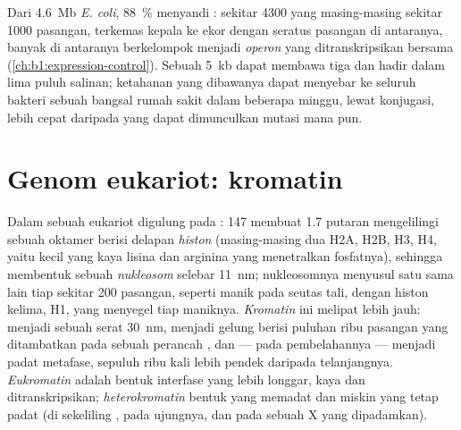 \begin{example}\label{ex:b1:genomes:dense}
Dari \qty{4.6}{Mb}  \emph{E. coli}, \qty{88}{\%} menyandi
: sekitar \num{4300}  yang masing-masing sekitar \num{1000}
pasangan, terkemas kepala ke ekor dengan seratus pasangan di antaranya,
banyak di antaranya berkelompok menjadi \emph{operon} yang
ditranskripsikan bersama (\cref{ch:b1:expression-control}). Sebuah
 \qty{5}{kb} dapat membawa tiga  dan hadir dalam lima puluh
salinan;  ketahanan yang dibawanya dapat menyebar ke seluruh bakteri
sebuah bangsal rumah sakit dalam beberapa minggu, lewat konjugasi, lebih
cepat daripada yang dapat dimunculkan mutasi mana pun.
\end{example}

\section{Genom eukariot: kromatin}

\begin{definition}\label{def:b1:genomes:nucleosome}
Dalam sebuah  eukariot  digulung pada : \qty{147}{}
 membuat 1.7 putaran mengelilingi sebuah oktamer berisi
delapan \emph{histon} (masing-masing dua H2A, H2B, H3, H4, yaitu
 kecil yang kaya lisina dan arginina yang menetralkan fosfatnya),
sehingga membentuk sebuah \emph{nukleosom} selebar
\qty{11}{nm}; nukleosomnya menyusul satu sama lain tiap sekitar
\qty{200}{} pasangan, seperti manik pada seutas tali, dengan histon
kelima, H1, yang menyegel tiap maniknya. \emph{Kromatin} ini melipat
lebih jauh: menjadi sebuah serat \qty{30}{nm}, menjadi gelung berisi
puluhan ribu pasangan yang ditambatkan pada sebuah perancah ,
dan --- pada pembelahannya --- menjadi  padat  metafase,
sepuluh ribu kali lebih pendek daripada  telanjangnya.
\emph{Eukromatin} adalah bentuk interfase yang lebih longgar, kaya 
dan ditranskripsikan; \emph{heterokromatin} bentuk yang memadat dan
miskin  yang tetap padat (di sekeliling , pada ujungnya,
dan pada sebuah  X yang dipadamkan).
\end{definition}

